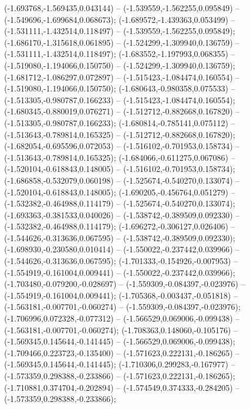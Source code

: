  (-1.693768,-1.569435,0.043144) -- (-1.539559,-1.562255,0.095849) -- (-1.549696,-1.699684,0.068673);
 (-1.689572,-1.439363,0.053499) -- (-1.531111,-1.432514,0.118497) -- (-1.539559,-1.562255,0.095849);
 (-1.686170,-1.315618,0.061895) -- (-1.524299,-1.309940,0.136759) -- (-1.531111,-1.432514,0.118497);
 (-1.683552,-1.197993,0.068355) -- (-1.519080,-1.194066,0.150750) -- (-1.524299,-1.309940,0.136759);
 (-1.681712,-1.086297,0.072897) -- (-1.515423,-1.084474,0.160554) -- (-1.519080,-1.194066,0.150750);
 (-1.680643,-0.980358,0.075533) -- (-1.513305,-0.980787,0.166233) -- (-1.515423,-1.084474,0.160554);
 (-1.680345,-0.880019,0.076271) -- (-1.512712,-0.882668,0.167820) -- (-1.513305,-0.980787,0.166233);
 (-1.680814,-0.785141,0.075112) -- (-1.513643,-0.789814,0.165325) -- (-1.512712,-0.882668,0.167820);
 (-1.682054,-0.695596,0.072053) -- (-1.516102,-0.701953,0.158734) -- (-1.513643,-0.789814,0.165325);
 (-1.684066,-0.611275,0.067086) -- (-1.520104,-0.618843,0.148005) -- (-1.516102,-0.701953,0.158734);
 (-1.686858,-0.532079,0.060198) -- (-1.525674,-0.540270,0.133074) -- (-1.520104,-0.618843,0.148005);
 (-1.690205,-0.456764,0.051279) -- (-1.532382,-0.464988,0.114179) -- (-1.525674,-0.540270,0.133074);
 (-1.693363,-0.381533,0.040026) -- (-1.538742,-0.389509,0.092330) -- (-1.532382,-0.464988,0.114179);
 (-1.696272,-0.306127,0.026406) -- (-1.544626,-0.313636,0.067595) -- (-1.538742,-0.389509,0.092330);
 (-1.698930,-0.230580,0.010414) -- (-1.550022,-0.237442,0.039966) -- (-1.544626,-0.313636,0.067595);
 (-1.701333,-0.154926,-0.007953) -- (-1.554919,-0.161004,0.009441) -- (-1.550022,-0.237442,0.039966);
 (-1.703480,-0.079200,-0.028697) -- (-1.559309,-0.084397,-0.023976) -- (-1.554919,-0.161004,0.009441);
 (-1.705368,-0.003437,-0.051818) -- (-1.563181,-0.007701,-0.060274) -- (-1.559309,-0.084397,-0.023976);
 (-1.706996,0.072328,-0.077312) -- (-1.566529,0.069006,-0.099438) -- (-1.563181,-0.007701,-0.060274);
 (-1.708363,0.148060,-0.105176) -- (-1.569345,0.145644,-0.141445) -- (-1.566529,0.069006,-0.099438);
 (-1.709466,0.223723,-0.135400) -- (-1.571623,0.222131,-0.186265) -- (-1.569345,0.145644,-0.141445);
 (-1.710306,0.299283,-0.167977) -- (-1.573359,0.298388,-0.233866) -- (-1.571623,0.222131,-0.186265);
 (-1.710881,0.374704,-0.202894) -- (-1.574549,0.374333,-0.284205) -- (-1.573359,0.298388,-0.233866);
